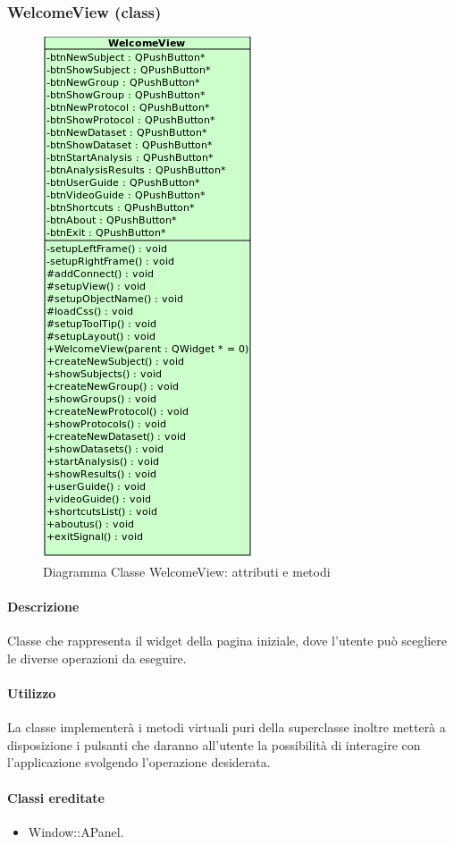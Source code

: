 \subsubsection{WelcomeView (class)}
\label{speWelView}
\begin{figure}[!h]
\centering
			\includegraphics[width=0.4\linewidth]{./Content/Immagini/view/WelcomeView.png}
			\caption{Diagramma Classe WelcomeView: attributi e metodi}
			\label{cl_welcomeV}
\end{figure}
\paragraph{Descrizione \\}
Classe che rappresenta il widget della pagina iniziale, dove l'utente può scegliere le diverse operazioni da eseguire.
\paragraph{Utilizzo\\}
La classe implementerà i metodi virtuali puri della superclasse inoltre metterà a disposizione i pulsanti che daranno all'utente la possibilità di interagire con l'applicazione svolgendo l'operazione desiderata.
\paragraph{Classi ereditate\\}
\begin{itemize}
\item Window::APanel.
\end{itemize}
